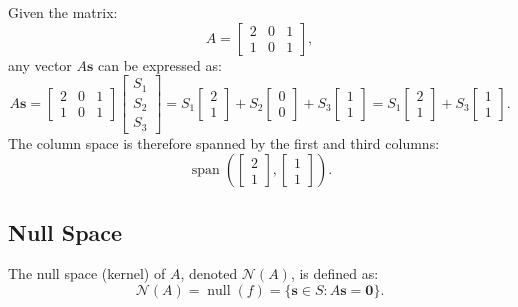 \documentclass{article}
\begin{document}
Given the matrix:
\[
A = \begin{bmatrix}
    2 & 0 & 1 \\
    1 & 0 & 1
\end{bmatrix},
\]
any vector \( A\mathbf{s} \) can be expressed as:
\[
A\mathbf{s} = \begin{bmatrix}
    2 & 0 & 1 \\
    1 & 0 & 1
\end{bmatrix}
\begin{bmatrix}
    S_1 \\
    S_2 \\
    S_3
\end{bmatrix}
= S_1\begin{bmatrix}
    2 \\
    1
\end{bmatrix}
+ S_2\begin{bmatrix}
    0 \\
    0
\end{bmatrix}
+ S_3\begin{bmatrix}
    1 \\
    1
\end{bmatrix}
= S_1\begin{bmatrix}
    2 \\
    1
\end{bmatrix}
+ S_3\begin{bmatrix}
    1 \\
    1
\end{bmatrix}.
\]
The column space is therefore spanned by the first and third columns:
\[
\operatorname{span}\left( \begin{bmatrix}2 \\ 1\end{bmatrix}, \begin{bmatrix}1 \\ 1\end{bmatrix} \right).
\]

\subsection{Null Space}
The null space (kernel) of \( A \), denoted \( \mathcal{N}(A) \), is defined as:
\[
\mathcal{N}(A) = \operatorname{null}(f) = \{ \mathbf{s} \in S : A\mathbf{s} = \mathbf{0} \}.
\]
\end{document}
